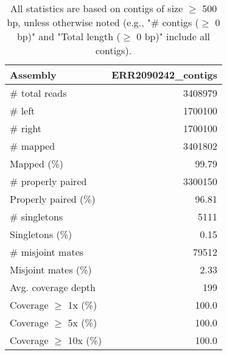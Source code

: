 \documentclass[12pt,a4paper]{article}
\begin{document}
\begin{table}[ht]
\begin{center}
\caption{All statistics are based on contigs of size $\geq$ 500 bp, unless otherwise noted (e.g., "\# contigs ($\geq$ 0 bp)" and "Total length ($\geq$ 0 bp)" include all contigs).}
\begin{tabular}{|l*{1}{|r}|}
\hline
Assembly & ERR2090242\_contigs \\ \hline
\# total reads & 3408979 \\ \hline
\# left & 1700100 \\ \hline
\# right & 1700100 \\ \hline
\# mapped & 3401802 \\ \hline
Mapped (\%) & 99.79 \\ \hline
\# properly paired & 3300150 \\ \hline
Properly paired (\%) & 96.81 \\ \hline
\# singletons & 5111 \\ \hline
Singletons (\%) & 0.15 \\ \hline
\# misjoint mates & 79512 \\ \hline
Misjoint mates (\%) & 2.33 \\ \hline
Avg. coverage depth & 199 \\ \hline
Coverage $\geq$ 1x (\%) & 100.0 \\ \hline
Coverage $\geq$ 5x (\%) & 100.0 \\ \hline
Coverage $\geq$ 10x (\%) & 100.0 \\ \hline
\end{tabular}
\end{center}
\end{table}
\end{document}
